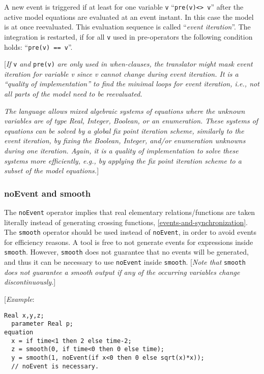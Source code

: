 A new event is triggered if at least for one variable \lstinline!v! ``\lstinline!pre(v)<> v!'' after the active model equations are
evaluated at an event instant. In this case the model is at once
reevaluated. This evaluation sequence is called ``\emph{event
iteration}''. The integration is restarted, if for all \lstinline!v! used in
pre-operators the following condition holds: ``\lstinline!pre(v) == v!''.

{[}\emph{If} \lstinline!v! \emph{and} \lstinline!pre(v)! \emph{are only used in when-clauses,
the translator might mask event iteration for variable v since v cannot
change during event iteration. It is a ``quality of implementation'' to
find the minimal loops for event iteration, i.e., not all parts of the
model need to be reevaluated. }

\emph{The language allows mixed algebraic systems of equations where the
unknown variables are of type Real, Integer, Boolean, or an enumeration.
These systems of equations can be solved by a global fix point iteration
scheme, similarly to the event iteration, by fixing the Boolean,
Integer, and/or enumeration unknowns during one iteration. Again, it is
a quality of implementation to solve these systems more efficiently,
e.g., by applying the fix point iteration scheme to a subset of the
model equations.}{]}

\subsubsection{noEvent and smooth}

The \lstinline!noEvent! operator implies that real elementary relations/functions
are taken literally instead of generating crossing functions, \autoref{events-and-synchronization}. 
The \lstinline!smooth! operator should be used instead of \lstinline!noEvent!, in order to
avoid events for efficiency reasons. A tool is free to not generate
events for expressions inside \lstinline!smooth!. However, \lstinline!smooth! does not guarantee
that no events will be generated, and thus it can be necessary to use
\lstinline!noEvent! inside \lstinline!smooth!. {[}\emph{Note that} \lstinline!smooth! \emph{does not
guarantee a smooth output if any of the occurring variables change
discontinuously.}{]}

{[}\emph{Example}:
\begin{lstlisting}[language=modelica]
  Real x,y,z;
  parameter Real p;
equation
  x = if time<1 then 2 else time-2;
  z = smooth(0, if time<0 then 0 else time);
  y = smooth(1, noEvent(if x<0 then 0 else sqrt(x)*x));
  // noEvent is necessary.
\end{lstlisting}

